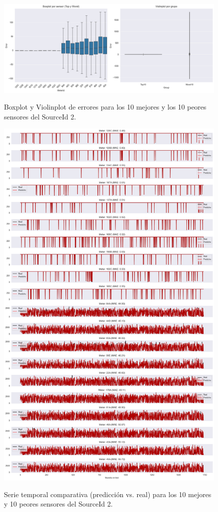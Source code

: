 \begin{figure}[H]
	\centering
	\caption{Boxplot y Violinplot de errores para los 10 mejores y los 10 peores sensores del SourceId 2.}
	\includegraphics[width=0.75\linewidth]{includes/cap5/graphs/advanced/sid2_10best_10worst_meter_boxplot_violinplot.png}
	\label{fig:sid2_violinplot_best_worst}
\end{figure}

\begin{figure}[H]
	\centering
	\caption{Serie temporal comparativa (predicción vs. real) para los 10 mejores y 10 peores sensores del SourceId 2.}
	\includegraphics[width=0.75\linewidth]{includes/cap5/graphs/advanced/sid2_10best_10worst_meter_time_series.png}
	\label{fig:sid2_timeseries_best_worst}
\end{figure}

